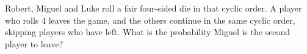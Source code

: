 Robert, Miguel and Luke roll a fair four-sided die in that cyclic order. A player who rolls 4 leaves the game, and the others continue in the same cyclic order, skipping players who have left. What is the probability Miguel is the second player to leave?
